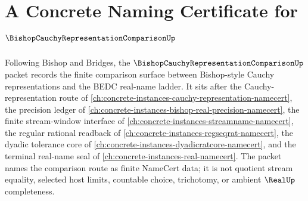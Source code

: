 \chapter{A Concrete Naming Certificate for $\BishopCauchyRepresentationComparisonUp$}
\label{ch:concrete-instances-bishop-cauchy-representation-comparison-namecert}

Following Bishop and Bridges, the $\BishopCauchyRepresentationComparisonUp$ packet records the finite comparison surface between Bishop-style Cauchy representations and the BEDC real-name ladder. It sits after the Cauchy-representation route of \autoref{ch:concrete-instances-cauchy-representation-namecert}, the precision ledger of \autoref{ch:concrete-instances-bishop-real-precision-namecert}, the finite stream-window interface of \autoref{ch:concrete-instances-streamname-namecert}, the regular rational readback of \autoref{ch:concrete-instances-regseqrat-namecert}, the dyadic tolerance core of \autoref{ch:concrete-instances-dyadicratcore-namecert}, and the terminal real-name seal of \autoref{ch:concrete-instances-real-namecert}. The packet names the comparison route as finite NameCert data; it is not quotient stream equality, selected host limits, countable choice, trichotomy, or ambient $\RealUp$ completeness.

